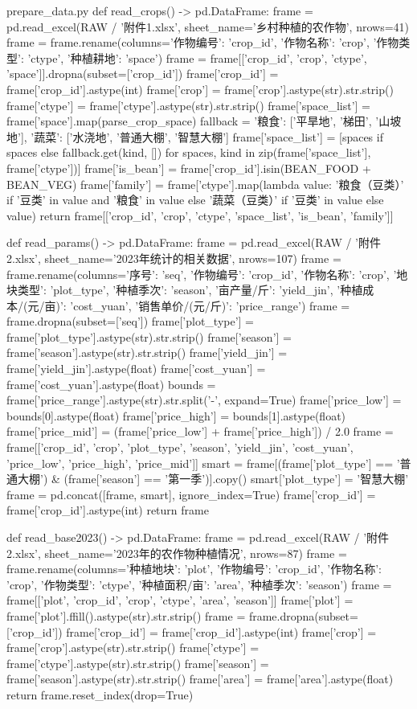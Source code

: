 \documentclass[bwprint]{gmcmthesis}
\begin{document}
\begin{appendices}
\begin{Python}{prepare\_data.py}
def read_crops() -> pd.DataFrame:
    frame = pd.read_excel(RAW / '附件1.xlsx', sheet_name='乡村种植的农作物', nrows=41)
    frame = frame.rename(columns={'作物编号': 'crop_id', '作物名称': 'crop', '作物类型': 'ctype', '种植耕地': 'space'})
    frame = frame[['crop_id', 'crop', 'ctype', 'space']].dropna(subset=['crop_id'])
    frame['crop_id'] = frame['crop_id'].astype(int)
    frame['crop'] = frame['crop'].astype(str).str.strip()
    frame['ctype'] = frame['ctype'].astype(str).str.strip()
    frame['space_list'] = frame['space'].map(parse_crop_space)
    fallback = {'粮食': ['平旱地', '梯田', '山坡地'], '蔬菜': ['水浇地', '普通大棚', '智慧大棚']}
    frame['space_list'] = [spaces if spaces else fallback.get(kind, []) for spaces, kind in zip(frame['space_list'], frame['ctype'])]
    frame['is_bean'] = frame['crop_id'].isin(BEAN_FOOD + BEAN_VEG)
    frame['family'] = frame['ctype'].map(lambda value: '粮食（豆类）' if '豆类' in value and '粮食' in value else '蔬菜（豆类）' if '豆类' in value else value)
    return frame[['crop_id', 'crop', 'ctype', 'space_list', 'is_bean', 'family']]

def read_params() -> pd.DataFrame:
    frame = pd.read_excel(RAW / '附件2.xlsx', sheet_name='2023年统计的相关数据', nrows=107)
    frame = frame.rename(columns={'序号': 'seq', '作物编号': 'crop_id', '作物名称': 'crop', '地块类型': 'plot_type', '种植季次': 'season', '亩产量/斤': 'yield_jin', '种植成本/(元/亩)': 'cost_yuan', '销售单价/(元/斤)': 'price_range'})
    frame = frame.dropna(subset=['seq'])
    frame['plot_type'] = frame['plot_type'].astype(str).str.strip()
    frame['season'] = frame['season'].astype(str).str.strip()
    frame['yield_jin'] = frame['yield_jin'].astype(float)
    frame['cost_yuan'] = frame['cost_yuan'].astype(float)
    bounds = frame['price_range'].astype(str).str.split('-', expand=True)
    frame['price_low'] = bounds[0].astype(float)
    frame['price_high'] = bounds[1].astype(float)
    frame['price_mid'] = (frame['price_low'] + frame['price_high']) / 2.0
    frame = frame[['crop_id', 'crop', 'plot_type', 'season', 'yield_jin', 'cost_yuan', 'price_low', 'price_high', 'price_mid']]
    smart = frame[(frame['plot_type'] == '普通大棚') & (frame['season'] == '第一季')].copy()
    smart['plot_type'] = '智慧大棚'
    frame = pd.concat([frame, smart], ignore_index=True)
    frame['crop_id'] = frame['crop_id'].astype(int)
    return frame

def read_base2023() -> pd.DataFrame:
    frame = pd.read_excel(RAW / '附件2.xlsx', sheet_name='2023年的农作物种植情况', nrows=87)
    frame = frame.rename(columns={'种植地块': 'plot', '作物编号': 'crop_id', '作物名称': 'crop', '作物类型': 'ctype', '种植面积/亩': 'area', '种植季次': 'season'})
    frame = frame[['plot', 'crop_id', 'crop', 'ctype', 'area', 'season']]
    frame['plot'] = frame['plot'].ffill().astype(str).str.strip()
    frame = frame.dropna(subset=['crop_id'])
    frame['crop_id'] = frame['crop_id'].astype(int)
    frame['crop'] = frame['crop'].astype(str).str.strip()
    frame['ctype'] = frame['ctype'].astype(str).str.strip()
    frame['season'] = frame['season'].astype(str).str.strip()
    frame['area'] = frame['area'].astype(float)
    return frame.reset_index(drop=True)


\end{Python}
\end{appendices}
\end{document}
